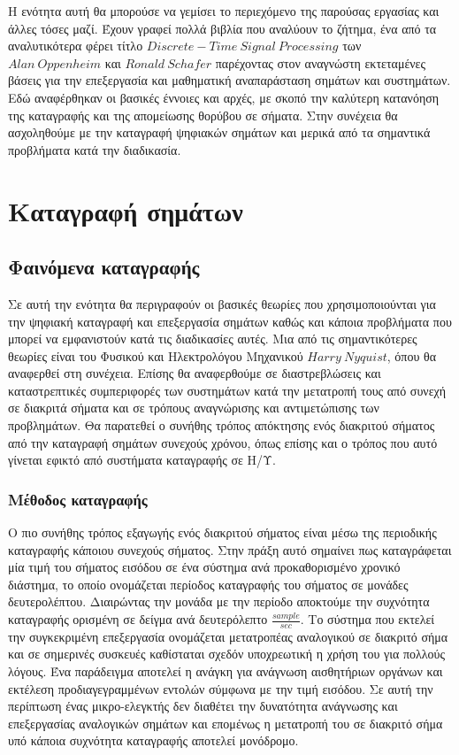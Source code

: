 \documentclass[breaklines=true, 12pt]{article}
\begin{document}
Η ενότητα αυτή θα μπορούσε να γεμίσει το περιεχόμενο της παρούσας εργασίας
και άλλες τόσες μαζί. Έχουν γραφεί πολλά βιβλία που αναλύουν το ζήτημα, ένα
από τα αναλυτικότερα φέρει τίτλο \(Discrete-Time\ Signal\ Processing\) των \(Alan\ Oppenheim\) και
\(Ronald\ Schafer\) παρέχοντας στον αναγνώστη εκτεταμένες βάσεις για την επεξεργασία
και μαθηματική αναπαράσταση σημάτων και συστημάτων. Εδώ αναφέρθηκαν οι βασικές
έννοιες και αρχές, με σκοπό την καλύτερη κατανόηση της καταγραφής και της
απομείωσης θορύβου σε σήματα. Στην συνέχεια θα ασχοληθούμε με την καταγραφή
ψηφιακών σημάτων και μερικά από τα σημαντικά προβλήματα κατά την διαδικασία.
\section{Καταγραφή σημάτων}
\label{sec:org8e3d79a}
\subsection{Φαινόμενα καταγραφής}
\label{sec:org7e7e03c}
    Σε αυτή την ενότητα θα περιγραφούν οι βασικές θεωρίες που χρησιμοποιούνται
για την ψηφιακή καταγραφή και επεξεργασία σημάτων καθώς και κάποια προβλήματα
που μπορεί να εμφανιστούν κατά τις διαδικασίες αυτές. Μια από τις σημαντικότερες
θεωρίες είναι του Φυσικού και Ηλεκτρολόγου Μηχανικού \(Harry\ Nyquist\),
όπου θα αναφερθεί στη συνέχεια. Επίσης θα αναφερθούμε σε διαστρεβλώσεις
και καταστρεπτικές συμπεριφορές των συστημάτων κατά την μετατροπή τους από
συνεχή σε διακριτά σήματα και σε τρόπους αναγνώρισης και αντιμετώπισης
των προβλημάτων. Θα παρατεθεί ο συνήθης τρόπος απόκτησης ενός διακριτού σήματος
από την καταγραφή σημάτων συνεχούς χρόνου, όπως επίσης και ο τρόπος που αυτό γίνεται
εφικτό από συστήματα καταγραφής σε Η/Υ.
\subsubsection{Μέθοδος καταγραφής}
\label{sec:org9147812}
Ο πιο συνήθης τρόπος εξαγωγής ενός διακριτού σήματος είναι μέσω της περιοδικής
καταγραφής κάποιου συνεχούς σήματος. Στην πράξη αυτό σημαίνει πως καταγράφεται
μία τιμή του σήματος εισόδου σε ένα σύστημα ανά προκαθορισμένο χρονικό διάστημα,
το οποίο ονομάζεται περίοδος καταγραφής του σήματος σε μονάδες δευτερολέπτου.
Διαιρώντας την μονάδα με την περίοδο αποκτούμε την συχνότητα καταγραφής ορισμένη
σε δείγμα ανά δευτερόλεπτο \(\displaystyle \frac{sample}{sec}\). Το σύστημα που εκτελεί την συγκεκριμένη
επεξεργασία ονομάζεται μετατροπέας αναλογικού σε διακριτό σήμα και σε σημερινές
συσκευές καθίσταται σχεδόν υποχρεωτική η χρήση του για πολλούς λόγους. Ένα
παράδειγμα αποτελεί η ανάγκη για ανάγνωση αισθητήριων οργάνων και εκτέλεση
προδιαγεγραμμένων εντολών σύμφωνα με την τιμή εισόδου. Σε αυτή την περίπτωση
ένας μικρο-ελεγκτής δεν διαθέτει την δυνατότητα ανάγνωσης και επεξεργασίας
αναλογικών σημάτων και επομένως η μετατροπή του σε διακριτό σήμα υπό κάποια
συχνότητα καταγραφής αποτελεί μονόδρομο.
\end{document}
